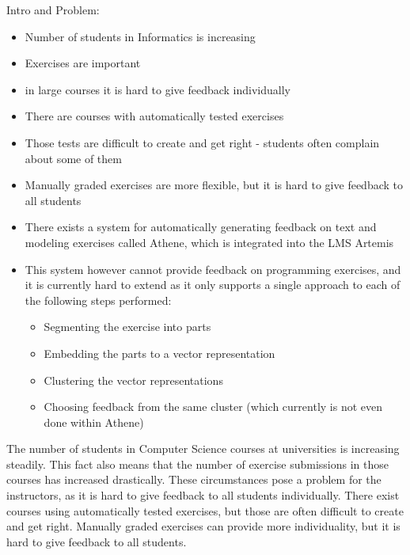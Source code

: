Intro and Problem:
\begin{itemize}
        \item Number of students in Informatics is increasing
        \item Exercises are important
        \item in large courses it is hard to give feedback individually
        \item There are courses with automatically tested exercises
        \item Those tests are difficult to create and get right - students often complain about some of them
        \item Manually graded exercises are more flexible, but it is hard to give feedback to all students
        \item There exists a system for automatically generating feedback on text and modeling exercises called Athene, which is integrated into the LMS Artemis
        \item This system however cannot provide feedback on programming exercises, and it is currently hard to extend as it only supports a single approach to each of the following steps performed:
        \begin{itemize}
                \item Segmenting the exercise into parts
                \item Embedding the parts to a vector representation
                \item Clustering the vector representations
                \item Choosing feedback from the same cluster (which currently is not even done within Athene)
        \end{itemize}
\end{itemize}
The number of students in Computer Science courses at universities is increasing steadily. This fact also means that the number of exercise submissions in those courses has increased drastically.
These circumstances pose a problem for the instructors, as it is hard to give feedback to all students individually. There exist courses using automatically tested exercises, but those are often difficult to create and get right. Manually graded exercises can provide more individuality, but it is hard to give feedback to all students.

